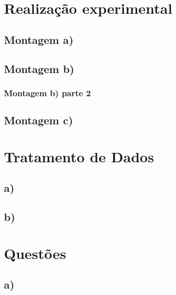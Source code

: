 \section{Realização experimental}

\subsection{Montagem a)}

\subsection{Montagem b)}

\subsubsection{Montagem b) parte 2}

\subsection{Montagem c)}






\section{Tratamento de Dados}
\subsection{a)}
\subsection{b)}



\section{Questões}
\subsection{a)}
